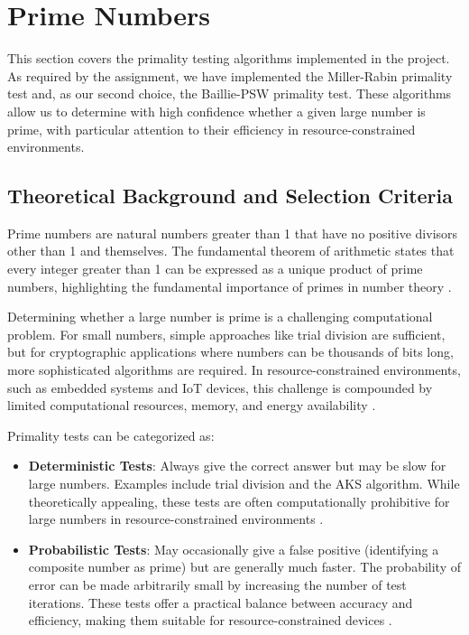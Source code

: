 \section{Prime Numbers}

This section covers the primality testing algorithms implemented in the project. As required by the assignment, we have implemented the Miller-Rabin primality test and, as our second choice, the Baillie-PSW primality test. These algorithms allow us to determine with high confidence whether a given large number is prime, with particular attention to their efficiency in resource-constrained environments.

\subsection{Theoretical Background and Selection Criteria}

Prime numbers are natural numbers greater than 1 that have no positive divisors other than 1 and themselves. The fundamental theorem of arithmetic states that every integer greater than 1 can be expressed as a unique product of prime numbers, highlighting the fundamental importance of primes in number theory \cite{crandall2005}.

Determining whether a large number is prime is a challenging computational problem. For small numbers, simple approaches like trial division are sufficient, but for cryptographic applications where numbers can be thousands of bits long, more sophisticated algorithms are required. In resource-constrained environments, such as embedded systems and IoT devices, this challenge is compounded by limited computational resources, memory, and energy availability \cite{resource_constrained}.

Primality tests can be categorized as:

\begin{itemize}
    \item \textbf{Deterministic Tests}: Always give the correct answer but may be slow for large numbers. Examples include trial division and the AKS algorithm. While theoretically appealing, these tests are often computationally prohibitive for large numbers in resource-constrained environments \cite{taxonomy_primality}.
    
    \item \textbf{Probabilistic Tests}: May occasionally give a false positive (identifying a composite number as prime) but are generally much faster. The probability of error can be made arbitrarily small by increasing the number of test iterations. These tests offer a practical balance between accuracy and efficiency, making them suitable for resource-constrained devices \cite{hardware_baillie}.
\end{itemize}

